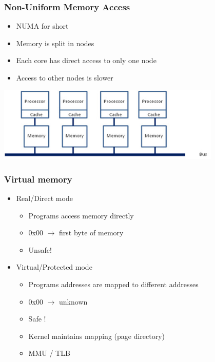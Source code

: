\begin{frame}
  \frametitle{Non-Uniform Memory Access}

  \begin{itemize}
  \item NUMA for short
  \item Memory is split in nodes
  \item Each core has direct access to only one node
  \item Access to other nodes is slower
  \end{itemize}

  \begin{center}
    \includegraphics[width=0.8\textwidth,height=0.5\textheight,keepaspectratio]{img/numa.jpg}
  \end{center}
\end{frame}


\begin{frame}
  \frametitle{Virtual memory}

  \begin{itemize}
  \item Real/Direct mode
    \begin{itemize}
    \item Programs access memory directly
    \item 0x00 $\rightarrow$ first byte of memory
    \item Unsafe!
    \end{itemize}
  \item Virtual/Protected mode
    \begin{itemize}
    \item Programs addresses are mapped to different addresses
    \item 0x00 $\rightarrow$ unknown
    \item Safe !
    \item Kernel maintains mapping (page directory)
    \item MMU / TLB
    \end{itemize}
  \end{itemize}
\end{frame}


